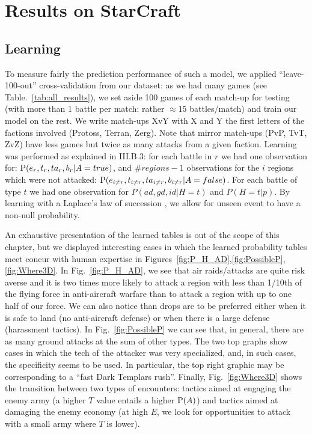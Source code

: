 \section{Results on StarCraft}

\subsection{Learning}
To measure fairly the prediction performance of such a model, we applied ``leave-100-out'' cross-validation from our dataset: as we had many games (see Table.~\ref{tab:all_results}), we set aside 100 games of each match-up for testing (with more than 1 battle per match: rather $\approx 15$ battles/match) and train our model on the rest. We write match-ups XvY with X and Y the first letters of the factions involved (Protoss, Terran, Zerg). Note that mirror match-ups (PvP, TvT, ZvZ) have less games but twice as many attacks from a given faction. Learning was performed as explained in III.B.3: for each battle in $r$ we had one observation for: $\mathrm{P}(e_r,t_r,ta_r,b_r|A=true)$, and $\#regions-1$ observations for the $i$ regions which were not attacked: $\mathrm{P}(e_{i \neq r},t_{i \neq r}, ta_{i \neq r}, b_{i \neq r}|A=false)$. For each battle of type $t$ we had one observation for $P(ad,gd,id|H=t)$ and $P(H=t|p)$. By learning with a Laplace's law of succession \cite{Jaynes}, we allow for unseen event to have a non-null probability.

An exhaustive presentation of the learned tables is out of the scope of this chapter, but we displayed interesting cases in which the learned probability tables meet concur with human expertise in Figures~\ref{fig:P_H_AD},\ref{fig:PossibleP},\ref{fig:Where3D}. In Fig.~\ref{fig:P_H_AD}, we see that air raids/attacks are quite risk averse and it is two times more likely to attack a region with less than 1/10th of the flying force in anti-aircraft warfare than to attack a region with up to one half of our force. We can also notice than drops are to be preferred either when it is safe to land (no anti-aircraft defense) or when there is a large defense (harassment tactics). In Fig.~\ref{fig:PossibleP} we can see that, in general, there are as many ground attacks at the sum of other types. The two top graphs show cases in which the tech of the attacker was very specialized, and, in such cases, the specificity seems to be used. In particular, the top right graphic may be corresponding to a ``fast Dark Templars rush''. Finally, Fig.~\ref{fig:Where3D} shows the transition between two types of encounters: tactics aimed at engaging the enemy army (a higher $T$ value entails a higher $\mathrm{P}(A)$) and tactics aimed at damaging the enemy economy (at high $E$, we look for opportunities to attack with a small army where $T$ is lower).

